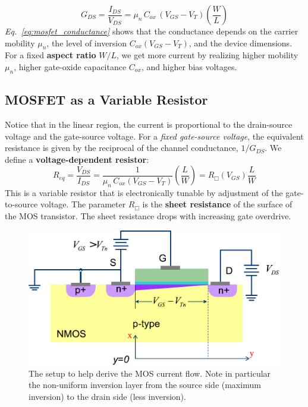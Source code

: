     \begin{equation}
        G_{DS} = \frac{I_{DS}}{V_{DS}} = {\mu_n\,C_{ox}\,\left(V_{GS} - V_T\right)} \left(\frac{W}{L}\right)
        \label{eq:mosfet_conductance}
    \end{equation}
\emph{Eq.~\ref{eq:mosfet_conductance}} shows that the conductance depends on the carrier mobility $\mu_n$, the level of inversion $C_{ox}(V_{GS}-V_T)$, and the device dimensions. For a fixed \textbf{aspect ratio} $W/L$, we get more current by realizing higher mobility $\mu_n$, higher gate-oxide capacitance $C_{ox}$, and higher bias voltages.  
\subsection{MOSFET as a Variable Resistor}
Notice that in the linear region, the current is proportional to the drain-source voltage and the gate-source voltage.  For a \textit{fixed gate-source voltage}, the equivalent resistance is given by the reciprocal of the channel conductance, $1/G_{DS}$.  We define a \textbf{voltage-dependent resistor}:
    \begin{equation}
        R_{eq} = \frac{V_{DS}}{I_{DS}}
        = \frac{1}{\mu_n\,C_{ox}(V_{GS} - V_T)} \left(\frac{L}{W}\right)
        = R_\Box(V_{GS})\frac{L}{W}
    \end{equation}
This is a variable resistor that is electronically tunable by adjustment of the gate-to-source voltage.  The parameter $R_\Box$ is the \textbf{sheet resistance} of the surface of the MOS transistor.  The sheet resistance drops with increasing gate overdrive.
\newpage
\begin{figure}[t]
\centering
\includegraphics[width=.85\columnwidth]{mos_current_derive}
\caption{The setup to help derive the MOS current flow.  Note in particular the non-uniform inversion layer from the source side (maximum inversion) to the drain side (less inversion).}
\label{fig:mos_current_derive}
\end{figure}
